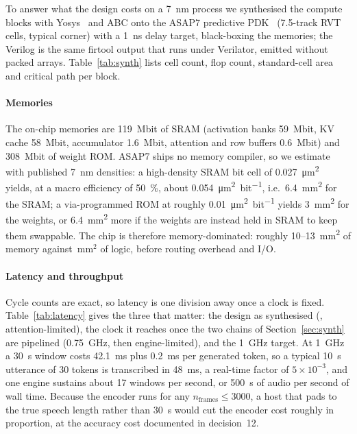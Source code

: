 \documentclass[conference]{IEEEtran}
\begin{document}
To answer what the design costs on a \SI{7}{nm} process we synthesised the compute blocks with Yosys~\cite{yosys} and ABC onto the ASAP7 predictive PDK~\cite{asap7} (7.5-track RVT cells, typical corner) with a \SI{1}{ns} delay target, black-boxing the memories; the Verilog is the same firtool output that runs under Verilator, emitted without packed arrays. Table~\ref{tab:synth} lists cell count, flop count, standard-cell area and critical path per block. \synthDiscussion

\paragraph{Memories} The on-chip memories are \SI{119}{Mbit} of SRAM (activation banks \SI{59}{Mbit}, KV cache \SI{58}{Mbit}, accumulator \SI{1.6}{Mbit}, attention and row buffers \SI{0.6}{Mbit}) and \SI{308}{Mbit} of weight ROM. ASAP7 ships no memory compiler, so we estimate with published \SI{7}{nm} densities: a high-density SRAM bit cell of \SI{0.027}{\micro\metre^2}~\cite{tsmc7sram} yields, at a macro efficiency of \SI{50}{\percent}, about \SI{0.054}{\micro\metre^2\per bit}, i.e.\ \SI{6.4}{mm^2} for the SRAM; a via-programmed ROM at roughly \SI{0.01}{\micro\metre^2\per bit} yields \SI{3}{mm^2} for the weights, or \SI{6.4}{mm^2} more if the weights are instead held in SRAM to keep them swappable. The chip is therefore memory-dominated: roughly \SI{10}{}--\SI{13}{mm^2} of memory against \areaLogicTotal\,mm$^2$ of logic, before routing overhead and I/O.

\paragraph{Latency and throughput} Cycle counts are exact, so latency is one division away once a clock is fixed. Table~\ref{tab:latency} gives the three that matter: the design as synthesised (\fmaxAll, attention-limited), the clock it reaches once the two chains of Section~\ref{sec:synth} are pipelined (\SI{0.75}{GHz}, then engine-limited), and the \SI{1}{GHz} target. At \SI{1}{GHz} a \SI{30}{s} window costs \SI{42.1}{ms} plus \SI{0.2}{ms} per generated token, so a typical \SI{10}{s} utterance of 30 tokens is transcribed in \SI{48}{ms}, a real-time factor of $5\times10^{-3}$, and one engine sustains about 17 windows per second, or \SI{500}{s} of audio per second of wall time. Because the encoder runs for any $n_{\mathrm{frames}}\le3000$, a host that pads to the true speech length rather than \SI{30}{s} would cut the encoder cost roughly in proportion, at the accuracy cost documented in decision~12.
\end{document}
